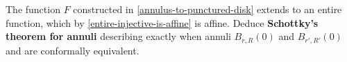 \documentclass{homework}
\begin{document}
                                                                                                                                                                            \begin{problem}
                                                                                                                                                                              The function $F$ constructed in \ref{annulus-to-punctured-disk}
                                                                                                                                                                                extends to an entire function, which by
                                                                                                                                                                                  \ref{entire-injective-is-affine} is affine.  Deduce
                                                                                                                                                                                    \textbf{Schottky's theorem for annuli} describing exactly when
                                                                                                                                                                                      annuli $B_{r,R}(0)$ and $B_{r',R'}(0)$ and are conformally
                                                                                                                                                                                        equivalent.
                                                                                                                                                                                        \end{problem}
\end{document}
